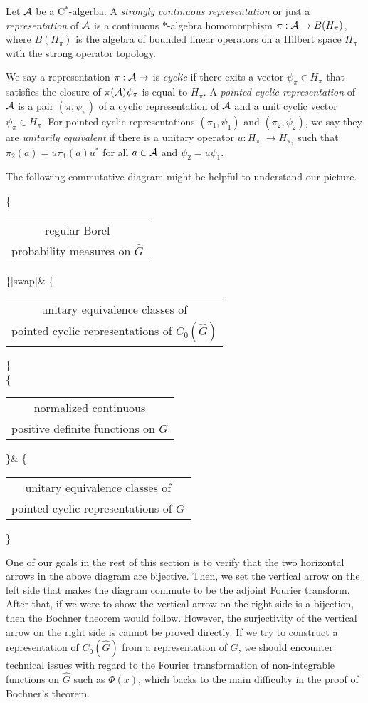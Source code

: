 \documentclass[a4paper]{article}
\begin{document}
\begin{defn}
Let $\mathcal{A}$ be a C$^*$-algerba.
A \emph{strongly continuous representation} or just a \emph{representation} of $\mathcal{A}$ is a continuous $*$-algebra homomorphism $\pi:\mathcal{A}\to B(H_\pi)$, where $B(H_\pi)$ is the algebra of bounded linear operators on a Hilbert space $H_\pi$ with the strong operator topology.

We say a representation $\pi:\mathcal{A}\to$ is \emph{cyclic} if there exits a vector $\psi_\pi\in H_\pi$ that satisfies the closure of $\pi(\mathcal{A})\psi_\pi$ is equal to $H_\pi$.
A \emph{pointed cyclic representation} of $\mathcal{A}$ is a pair $(\pi,\psi_\pi)$ of a cyclic representation of $\mathcal{A}$ and a unit cyclic vector $\psi_\pi\in H_\pi$.
For pointed cyclic representations $(\pi_1,\psi_1)$ and $(\pi_2,\psi_2)$, we say they are \emph{unitarily equivalent} if there is a unitary operator $u:H_{\pi_1}\to H_{\pi_2}$ such that $\pi_2(a)=u\pi_1(a)u^*$ for all $a\in\mathcal{A}$ and $\psi_2=u\psi_1$.
\end{defn}

The following commutative diagram might be helpful to understand our picture.
\begin{cd}
\left\{\begin{tabular}{c}regular Borel\\probability measures on $\hat G$\end{tabular}\right\}[swap]{}&
\left\{\begin{tabular}{c}unitary equivalence classes of\\pointed cyclic representations of $C_0(\hat G)$\end{tabular}\right\}\\
\left\{\begin{tabular}{c}normalized continuous\\positive definite functions on $G$\end{tabular}\right\}&
\left\{\begin{tabular}{c}unitary equivalence classes of\\pointed cyclic representations of $G$\end{tabular}\right\}
\end{cd}
One of our goals in the rest of this section is to verify that the two horizontal arrows in the above diagram are bijective.
Then, we set the vertical arrow on the left side that makes the diagram commute to be the adjoint Fourier transform.
After that, if we were to show the vertical arrow on the right side is a bijection, then the Bochner theorem would follow.
However, the surjectivity of the vertical arrow on the right side is cannot be proved directly.
If we try to construct a representation of $C_0(\hat G)$ from a representation of $G$, we should encounter technical issues with regard to the Fourier transformation of non-integrable functions on $\hat G$ such as $\Phi(x)$, which backs to the main difficulty in the proof of Bochner's theorem.
\end{document}
